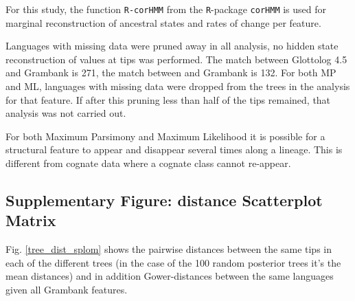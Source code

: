 \documentclass[12pt,letterpaper]{article}
\begin{document}
For this study, the function \texttt{R-corHMM} from the \texttt{R}-package \texttt{corHMM} \citep{R-corHMM} is used for marginal reconstruction of ancestral states and rates of change per feature. %


Languages with missing data were pruned away in all analysis, no hidden state reconstruction of values at tips was performed. The match between Glottolog 4.5 and Grambank is 271, the match between \citet{grayetal_2009} and Grambank is 132. For both MP and ML, languages with missing data were dropped from the trees in the analysis for that feature. If after this pruning less than half of the tips remained, that analysis was not carried out.

For both Maximum Parsimony and Maximum Likelihood it is possible for a structural feature to appear and disappear several times along a lineage. This is different from cognate data where a cognate class cannot re-appear.

\FloatBarrier
\newpage
\subsection{Supplementary Figure: distance Scatterplot Matrix}
Fig. \ref{tree_dist_splom} shows the pairwise distances between the same tips in each of the different trees (in the case of the 100 random posterior trees it's the mean distances) and in addition Gower-distances between the same languages given all Grambank features.
\end{document}
